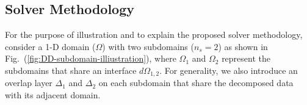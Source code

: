 \documentclass[conference]{IEEEtran}
\newcommand{\fig}[1]{Fig.~(\ref{#1})}
\begin{document}

\subsection{Solver Methodology}
\label{sec:solver-methodology}

For the purpose of illustration and to explain the proposed solver methodology, consider a 1-D domain ($\Omega$) with two subdomains ($n_s=2$) as shown in \fig{fig:DD-subdomain-illiustration}, where $\Omega_1$ and $\Omega_2$ represent the subdomains that share an interface $d\Omega_{1,2}$. For generality, we also introduce an overlap layer $\Delta_1$ and $\Delta_2$ on each subdomain that share the decomposed data with its adjacent domain. 

\end{document}
